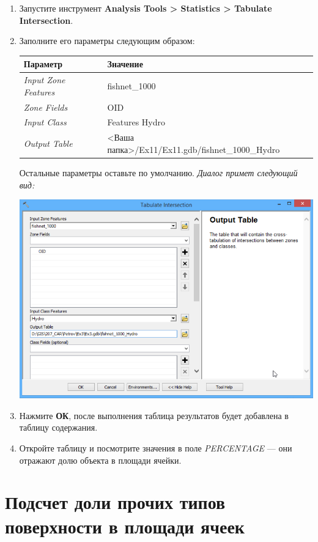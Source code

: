 \documentclass[12pt,]{book}
\begin{document}
\begin{enumerate}
\def\labelenumi{\arabic{enumi}.}
\item
  Запустите инструмент \textbf{Analysis Tools \textgreater{} Statistics \textgreater{} Tabulate Intersection}.
\item
  Заполните его параметры следующим образом:

  \begin{longtable}[]{@{}ll@{}}
  \toprule
  Параметр & Значение\tabularnewline
  \midrule
  \endhead
  \emph{Input Zone Features} & fishnet\_1000\tabularnewline
  \emph{Zone Fields} & OID\tabularnewline
  \emph{Input Class} & Features Hydro\tabularnewline
  \emph{Output Table} & \textless{}Ваша папка\textgreater{}/Ex11/Ex11.gdb/fishnet\_1000\_Hydro\tabularnewline
  \bottomrule
  \end{longtable}

  Остальные параметры оставьте по умолчанию. \emph{Диалог примет следующий вид:}

  \includegraphics{images/Ex11/image9.png}
\item
  Нажмите \textbf{ОК}, после выполнения таблица результатов будет добавлена в таблицу содержания.
\item
  Откройте таблицу и посмотрите значения в поле \emph{PERCENTAGE} --- они отражают долю объекта в площади ячейки.
\end{enumerate}

\hypertarget{land-cover-hydro-others}{%
\section{Подсчет доли прочих типов поверхности в площади ячеек}\label{land-cover-hydro-others}}
\end{document}
